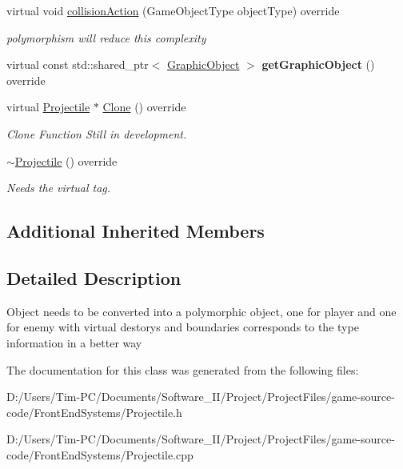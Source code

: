 \begin{DoxyCompactItemize}
\item 
\mbox{\label{class_projectile_a8dae5b6cc0293fc6c85797fcf2019492}} 
virtual void \hyperlink{class_projectile_a8dae5b6cc0293fc6c85797fcf2019492}{collision\+Action} (Game\+Object\+Type object\+Type) override
\begin{DoxyCompactList}\small\item\em polymorphism will reduce this complexity \end{DoxyCompactList}\item 
\mbox{\label{class_projectile_a639f52184c8b9720ca8c36371303332d}} 
virtual const std\+::shared\+\_\+ptr$<$ \hyperlink{class_graphic_object}{Graphic\+Object} $>$ {\bfseries get\+Graphic\+Object} () override
\item 
\mbox{\label{class_projectile_a39653a4aa80df0364e15854f0f5e389d}} 
virtual \hyperlink{class_projectile}{Projectile} $\ast$ \hyperlink{class_projectile_a39653a4aa80df0364e15854f0f5e389d}{Clone} () override
\begin{DoxyCompactList}\small\item\em Clone Function Still in development. \end{DoxyCompactList}\item 
\mbox{\label{class_projectile_add4d983566a326200ea1d7c74737e108}} 
\hyperlink{class_projectile_add4d983566a326200ea1d7c74737e108}{$\sim$\+Projectile} () override
\begin{DoxyCompactList}\small\item\em Needs the virtual tag. \end{DoxyCompactList}\end{DoxyCompactItemize}
\subsection*{Additional Inherited Members}


\subsection{Detailed Description}
Object needs to be converted into a polymorphic object, one for player and one for enemy with virtual destorys and boundaries corresponds to the type information in a better way 

The documentation for this class was generated from the following files\+:\begin{DoxyCompactItemize}
\item 
D\+:/\+Users/\+Tim-\/\+P\+C/\+Documents/\+Software\+\_\+\+I\+I/\+Project/\+Project\+Files/game-\/source-\/code/\+Front\+End\+Systems/Projectile.\+h\item 
D\+:/\+Users/\+Tim-\/\+P\+C/\+Documents/\+Software\+\_\+\+I\+I/\+Project/\+Project\+Files/game-\/source-\/code/\+Front\+End\+Systems/Projectile.\+cpp\end{DoxyCompactItemize}
